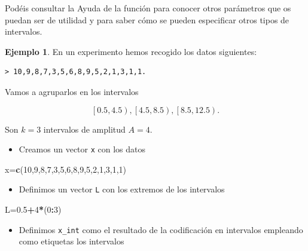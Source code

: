 \documentclass[
]{book}
\newenvironment{Shaded}{\begin{snugshade}}{\end{snugshade}}
\newcommand{\DecValTok}[1]{\textcolor[rgb]{0.00,0.00,0.81}{#1}}
\newcommand{\FloatTok}[1]{\textcolor[rgb]{0.00,0.00,0.81}{#1}}
\newcommand{\KeywordTok}[1]{\textcolor[rgb]{0.13,0.29,0.53}{\textbf{#1}}}
\newcommand{\NormalTok}[1]{#1}
\newcommand{\OperatorTok}[1]{\textcolor[rgb]{0.81,0.36,0.00}{\textbf{#1}}}
\providecommand{\tightlist}{%
  \setlength{\itemsep}{0pt}\setlength{\parskip}{0pt}}
\theoremstyle{definition}
\theoremstyle{definition}
\newtheorem{example}{Ejemplo}[chapter]
\theoremstyle{definition}
\theoremstyle{remark}
\begin{document}
Podéis consultar la Ayuda de la función para conocer otros parámetros que os puedan ser de utilidad y para saber cómo se pueden especificar otros tipos de intervalos.

\begin{example}
\protect\hypertarget{exm:cut}{}{\label{exm:cut} }En un experimento hemos recogido los datos siguientes:
\end{example}

\begin{verbatim}
> 10,9,8,7,3,5,6,8,9,5,2,1,3,1,1.
\end{verbatim}

Vamos a agruparlos en los intervalos

\[
\left[0.5,4.5\right), \left[4.5,8.5\right), \left[8.5,12.5\right).
\]

Son \(k=3\) intervalos de amplitud \(A=4\).

\begin{itemize}
\tightlist
\item
  Creamos un vector \texttt{x} con los datos
\end{itemize}

\begin{Shaded}
\begin{Highlighting}[]
\NormalTok{x=}\KeywordTok{c}\NormalTok{(}\DecValTok{10}\NormalTok{,}\DecValTok{9}\NormalTok{,}\DecValTok{8}\NormalTok{,}\DecValTok{7}\NormalTok{,}\DecValTok{3}\NormalTok{,}\DecValTok{5}\NormalTok{,}\DecValTok{6}\NormalTok{,}\DecValTok{8}\NormalTok{,}\DecValTok{9}\NormalTok{,}\DecValTok{5}\NormalTok{,}\DecValTok{2}\NormalTok{,}\DecValTok{1}\NormalTok{,}\DecValTok{3}\NormalTok{,}\DecValTok{1}\NormalTok{,}\DecValTok{1}\NormalTok{)}
\end{Highlighting}
\end{Shaded}

\begin{itemize}
\tightlist
\item
  Definimos un vector \texttt{L} con los extremos de los intervalos
\end{itemize}

\begin{Shaded}
\begin{Highlighting}[]
\NormalTok{L=}\FloatTok{0.5}\OperatorTok{+}\DecValTok{4}\OperatorTok{*}\NormalTok{(}\DecValTok{0}\OperatorTok{:}\DecValTok{3}\NormalTok{)}
\end{Highlighting}
\end{Shaded}

\begin{itemize}
\tightlist
\item
  Definimos \texttt{x\_int} como el resultado de la codificación en intervalos empleando como etiquetas los intervalos
\end{itemize}
\end{document}
